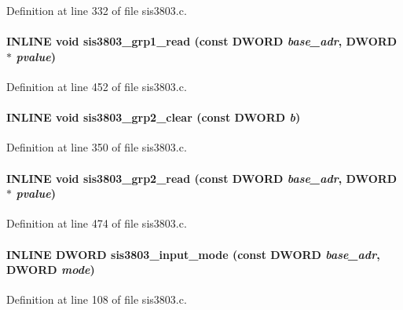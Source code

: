 Definition at line 332 of file sis3803.c.
\paragraph[{sis3803\_\-grp1\_\-read}]{\setlength{\rightskip}{0pt plus 5cm}INLINE void sis3803\_\-grp1\_\-read (const {\bf DWORD} {\em base\_\-adr}, \/  {\bf DWORD} $\ast$ {\em pvalue})}\hfill\label{sis3803_8h_a50a4bb2410f0285e043c7055c5fed1b8}


Definition at line 452 of file sis3803.c.
\paragraph[{sis3803\_\-grp2\_\-clear}]{\setlength{\rightskip}{0pt plus 5cm}INLINE void sis3803\_\-grp2\_\-clear (const {\bf DWORD} {\em b})}\hfill\label{sis3803_8h_ad057679f95c8fb1b747bc39bde501e6b}


Definition at line 350 of file sis3803.c.
\paragraph[{sis3803\_\-grp2\_\-read}]{\setlength{\rightskip}{0pt plus 5cm}INLINE void sis3803\_\-grp2\_\-read (const {\bf DWORD} {\em base\_\-adr}, \/  {\bf DWORD} $\ast$ {\em pvalue})}\hfill\label{sis3803_8h_a4d46ce0902c7bcb72dd7ed88c3fe47c6}


Definition at line 474 of file sis3803.c.
\paragraph[{sis3803\_\-input\_\-mode}]{\setlength{\rightskip}{0pt plus 5cm}INLINE {\bf DWORD} sis3803\_\-input\_\-mode (const {\bf DWORD} {\em base\_\-adr}, \/  {\bf DWORD} {\em mode})}\hfill\label{sis3803_8h_ad68630e551f953933a4dde5b8c1b764c}


Definition at line 108 of file sis3803.c.

